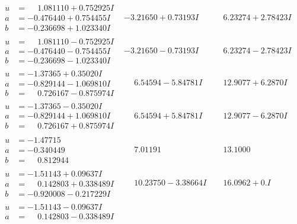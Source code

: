 \documentclass[1p]{elsarticle_modified}
\theoremstyle{definition}
\begin{document}
$$\begin{array}{c|c|c}
\begin{aligned}
u &= \phantom{-}1.081110 + 0.752925 I \\
a &= -0.476440 + 0.754455 I \\
b &= -0.236698 + 1.023340 I\end{aligned}
 & -3.21650 + 0.73193 I & \phantom{-}6.23274 + 2.78423 I \\ \hline\begin{aligned}
u &= \phantom{-}1.081110 - 0.752925 I \\
a &= -0.476440 - 0.754455 I \\
b &= -0.236698 - 1.023340 I\end{aligned}
 & -3.21650 - 0.73193 I & \phantom{-}6.23274 - 2.78423 I \\ \hline\begin{aligned}
u &= -1.37365 + 0.35020 I \\
a &= -0.829144 - 1.069810 I \\
b &= \phantom{-}0.726167 - 0.875974 I\end{aligned}
 & \phantom{-}6.54594 - 5.84781 I & \phantom{-}12.9077 + 6.2870 I \\ \hline\begin{aligned}
u &= -1.37365 - 0.35020 I \\
a &= -0.829144 + 1.069810 I \\
b &= \phantom{-}0.726167 + 0.875974 I\end{aligned}
 & \phantom{-}6.54594 + 5.84781 I & \phantom{-}12.9077 - 6.2870 I \\ \hline\begin{aligned}
u &= -1.47715\phantom{ +0.000000I} \\
a &= -0.340449\phantom{ +0.000000I} \\
b &= \phantom{-}0.812944\phantom{ +0.000000I}\end{aligned}
 & \phantom{-}7.01191\phantom{ +0.000000I} & \phantom{-}13.1000\phantom{ +0.000000I} \\ \hline\begin{aligned}
u &= -1.51143 + 0.09637 I \\
a &= \phantom{-}0.142803 + 0.338489 I \\
b &= -0.920008 - 0.217229 I\end{aligned}
 & \phantom{-}10.23750 - 3.38664 I & \phantom{-}16.0962 + 0. I\phantom{ +0.000000I} \\ \hline\begin{aligned}
u &= -1.51143 - 0.09637 I \\
a &= \phantom{-}0.142803 - 0.338489 I \\

\end{aligned}
\end{array}$$
\end{document}
